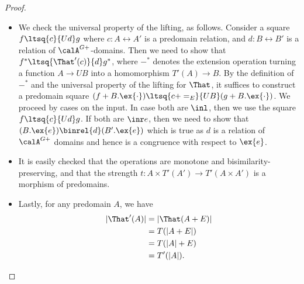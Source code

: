 \begin{proof}
\begin{itemize}
        \item We check the universal property of the lifting, as follows.
        Consider a square $f \ltsq{c}{Ud} g$ where $c : A \rel A'$ is a
        predomain relation, and $d : B \rel B'$ is a relation of
        $\calA^{G+}$-domains.
        Then we need to show that $f^* \ltsq{\That'(c)}{d} g^*$, where $-^*$
        denotes the extension operation turning a function $A \to UB$ into a
        homomorphism $T'(A) \to B$. By the definition of $-^*$ and the universal
        property of the lifting for $\That$, it suffices to construct a
        predomain square
        $(f + B.\ex{\cdot}) \ltsq{c + =_E}{UB} (g + B.\ex{\cdot})$.
        We proceed by cases on the input. In case both are $\inl$, then we use
        the square $f \ltsq{c}{Ud} g$. If both are $\inr e$, then we need to
        show that $(B.\ex{e}) \binrel{d} (B'.\ex{e})$ which is true as $d$ is a
        relation of $\calA^{G+}$ domains and hence is a congruence with respect
        to $\ex{e}$.


        \item It is easily checked that the operations are monotone and
        bisimilarity-preserving, and that the strength
        $t : A \times T'(A') \to T'(A \times A')$ is a morphism of predomains.
        \item Lastly, for any predomain $A$, we have   
        \begin{align*}
            |\That'(A)| 
            &= |\That(A + E)| \\
            &= T(|A + E|)\\ 
            &= T(|A| + E)\\ 
            &= T'(|A|).
        \end{align*}
    \end{itemize}
\end{proof}

